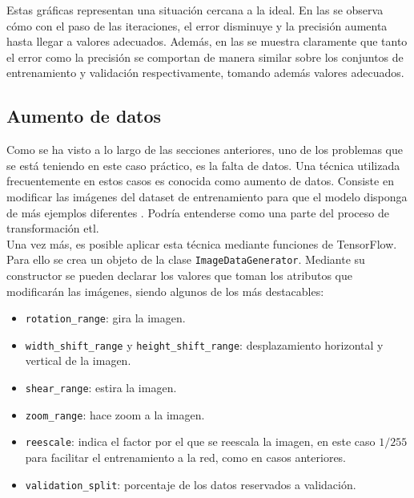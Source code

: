 			Estas gráficas representan una situación cercana a la ideal. En las  se observa cómo con el paso de las iteraciones, el error disminuye y la precisión aumenta hasta llegar a valores adecuados. Además, en las  se muestra claramente que tanto el error como la precisión se comportan de manera similar sobre los conjuntos de entrenamiento y validación respectivamente, tomando además valores adecuados. 
			
		\subsection{Aumento de datos}
		
			Como se ha visto a lo largo de las secciones anteriores, uno de los problemas que se está teniendo en este caso práctico, es la falta de datos. Una técnica utilizada frecuentemente en estos casos es conocida como aumento de datos. Consiste en modificar las imágenes del dataset de entrenamiento para que el modelo disponga de más ejemplos diferentes \cite{augm}. Podría entenderse como una parte del proceso de transformación \gls{etl}. \\
			
			Una vez más, es posible aplicar esta técnica mediante funciones de TensorFlow. Para ello se crea un objeto de la clase \texttt{ImageDataGenerator}. Mediante su constructor se pueden declarar los valores que toman los atributos que modificarán las imágenes, siendo algunos de los más destacables: 
			
			\begin{itemize}
				\item \texttt{rotation\_range}: gira la imagen. 
				\item \texttt{width\_shift\_range} y \texttt{height\_shift\_range}: desplazamiento horizontal y vertical de la imagen. 
				\item \texttt{shear\_range}: estira la imagen. 
				\item \texttt{zoom\_range}: hace zoom a la imagen. 
				\item \texttt{reescale}: indica el factor por el que se reescala la imagen, en este caso $1/255$ para facilitar el entrenamiento a la red, como en casos anteriores. 
				\item \texttt{validation\_split}: porcentaje de los datos reservados a validación. 
			\end{itemize}
			
